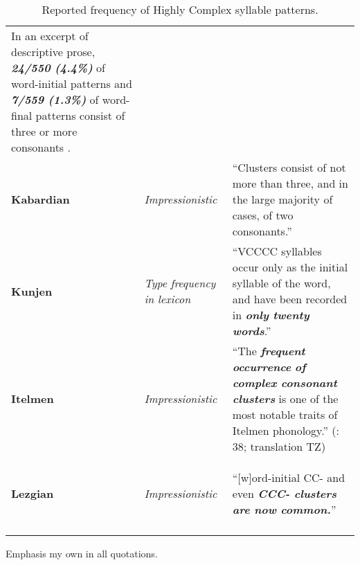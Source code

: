 \begin{table}
\begin{tabularx}{\textwidth}{XXX}
In an excerpt of descriptive prose, \textbf{\textit{24/550} \textit{(4.4\%)}} of word-initial patterns and \textbf{\textit{7/559} \textit{(1.3\%)}} of word-final patterns consist of three or more consonants \citep[79-80]{Vogt1958}.\\
\textbf{Kabardian} & \textit{Impressionistic} & “Clusters consist of not more than three, and in the large majority of cases, of two consonants.” \citep[29]{Kuipers1960}\\
\textbf{Kunjen} & \textit{Type} \textit{frequency} \textit{in} \textit{lexicon} & “VCCCC syllables occur only as the initial syllable of the word, and have been recorded in \textbf{\textit{only} \textit{twenty} \textit{words}}.” \citep[35]{Sommer1969}\\
\textbf{Itelmen} & \textit{Impressionistic} & “The \textbf{\textit{frequent} \textit{occurrence}} \textbf{\textit{of} \textit{complex} \textit{consonant} \textit{clusters}} is one of the most notable traits of Itelmen phonology.” (\citealt{GeorgVolodin1999}: 38; translation TZ)\\
\textbf{Lezgian} & \textit{Impressionistic} & “[w]ord-initial CC- and even \textbf{\textit{CCC-} \textit{clusters} \textit{are} \textit{now} \textit{common.}}” 

\citep[46]{Haspelmath1993}\\
\lspbottomrule
\end{tabularx}
\caption{\label{3.14}Reported frequency of Highly Complex syllable patterns.}Emphasis my own in all quotations.
\end{table}





